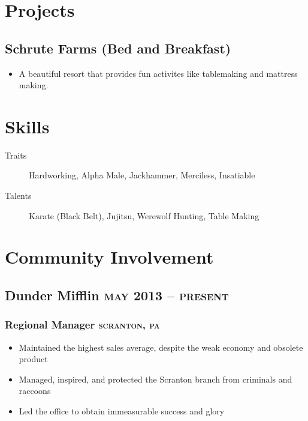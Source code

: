 \documentclass{article}
\newcommand{\rside}[1]{\hfill \normalfont\scshape\MakeLowercase{#1}}
\begin{document}
\section{\faFlask\enspace Projects}

\subsection{Schrute Farms (Bed and Breakfast)}
\begin{itemize}
  \item A beautiful resort that provides fun activites like tablemaking and mattress making.
\end{itemize}


\section{\faCogs\enspace Skills}
\begin{description}
  \item[Traits] Hardworking, Alpha Male, Jackhammer, Merciless, Insatiable
  \item[Talents] Karate (Black Belt), Jujitsu, Werewolf Hunting, Table Making 
\end{description}




\section{\faHandsHelping \enspace Community Involvement}
\subsection{Dunder Mifflin \rside{May 2013 -- Present}}
\subsubsection{Regional Manager \rside{Scranton, PA}}
\begin{itemize}
  \item Maintained the highest sales average, despite the weak economy and obsolete product
  \item Managed, inspired, and protected the Scranton branch from criminals and raccoons
  \item Led the office to obtain immeasurable success and glory
\end{itemize}
\end{document}
